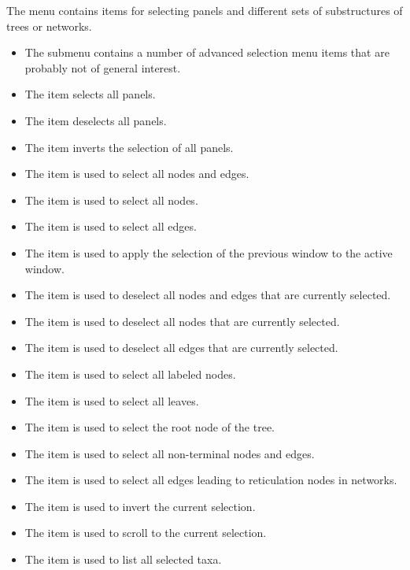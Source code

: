 \documentclass[11pt]{article}
\begin{document}
The  menu contains items for selecting panels and different sets
of substructures of trees or networks.
\begin{itemize}	
\item The  submenu contains a number of advanced selection menu items that are probably
not of general interest.
\item The  item selects all panels.
\item The  item deselects all panels.
\item The  item inverts the selection of all panels.
\item The  item is used to select all nodes and edges.
\item The  item is used to select all nodes.
\item The  item is used to select all edges.
\item The  item is used to apply the selection of the previous window to the active window.
\item The  item is used to deselect all nodes and edges that are currently selected.
\item The  item is used to deselect all nodes that are currently selected.
\item The  item is used to deselect all edges that are currently selected.
\item The  item is used to select all labeled nodes.
\item The  item is used to select all leaves.
\item The  item is used to select the root node of the tree.
\item The  item is used to select all non-terminal
nodes and edges.
\item The  item is used to select all edges leading to reticulation nodes in networks.
\item The  item is used to invert the current selection.
\item The  item is used to scroll to the current selection.
\item The  item is used to list all selected taxa.
\end{itemize}
\end{document}
